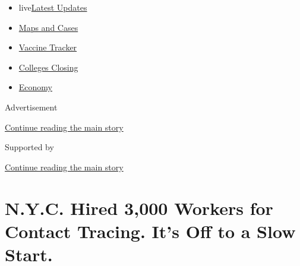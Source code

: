 \begin{itemize}
\tightlist
\item
  live\href{https://www.nytimes3xbfgragh.onion/2020/08/20/world/coronavirus-covid.html?name=styln-coronavirus-national\&region=TOP_BANNER\&variant=undefined\&block=storyline_menu_recirc\&action=click\&pgtype=Article\&impression_id=dc93fbb0-e386-11ea-80a3-6f317e203e1c}{Latest
  Updates}
\item
  \href{https://www.nytimes3xbfgragh.onion/interactive/2020/us/coronavirus-us-cases.html?name=styln-coronavirus-national\&region=TOP_BANNER\&variant=undefined\&block=storyline_menu_recirc\&action=click\&pgtype=Article\&impression_id=dc93fbb1-e386-11ea-80a3-6f317e203e1c}{Maps
  and Cases}
\item
  \href{https://www.nytimes3xbfgragh.onion/interactive/2020/science/coronavirus-vaccine-tracker.html?name=styln-coronavirus-national\&region=TOP_BANNER\&variant=undefined\&block=storyline_menu_recirc\&action=click\&pgtype=Article\&impression_id=dc93fbb2-e386-11ea-80a3-6f317e203e1c}{Vaccine
  Tracker}
\item
  \href{https://www.nytimes3xbfgragh.onion/2020/08/19/us/colleges-closing-covid.html?name=styln-coronavirus-national\&region=TOP_BANNER\&variant=undefined\&block=storyline_menu_recirc\&action=click\&pgtype=Article\&impression_id=dc93fbb3-e386-11ea-80a3-6f317e203e1c}{Colleges
  Closing}
\item
  \href{https://www.nytimes3xbfgragh.onion/live/2020/08/20/business/stock-market-today-coronavirus?name=styln-coronavirus-national\&region=TOP_BANNER\&variant=undefined\&block=storyline_menu_recirc\&action=click\&pgtype=Article\&impression_id=dc93fbb4-e386-11ea-80a3-6f317e203e1c}{Economy}
\end{itemize}

Advertisement

\protect\hyperlink{after-top}{Continue reading the main story}

Supported by

\protect\hyperlink{after-sponsor}{Continue reading the main story}

\hypertarget{nyc-hired-3000-workers-for-contact-tracing-its-off-to-a-slow-start}{%
\section{N.Y.C. Hired 3,000 Workers for Contact Tracing. It's Off to a
Slow
Start.}\label{nyc-hired-3000-workers-for-contact-tracing-its-off-to-a-slow-start}}

